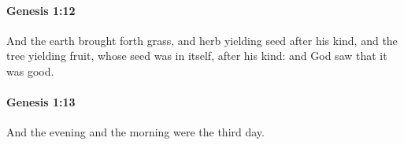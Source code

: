 		\paragraph{Genesis 1:12} %
			\label{GENESIS-1-12}

			And the earth brought forth grass, and herb yielding seed after his kind, and the tree yielding fruit, whose seed was in itself, after his kind: and God saw that it was good.


		\paragraph{Genesis 1:13} %
			\label{GENESIS-1-13}

			And the evening and the morning were the third day.


